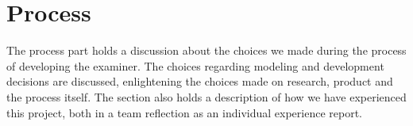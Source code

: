 



\section{Process}

The process part holds a discussion about the choices we made
during the process of developing the \gls{examiner}. The choices regarding 
modeling and development decisions are discussed, enlightening the choices made
on research, product and the process itself. The section also holds a description
of how we have experienced this project, both in a team reflection as an 
individual experience report.


